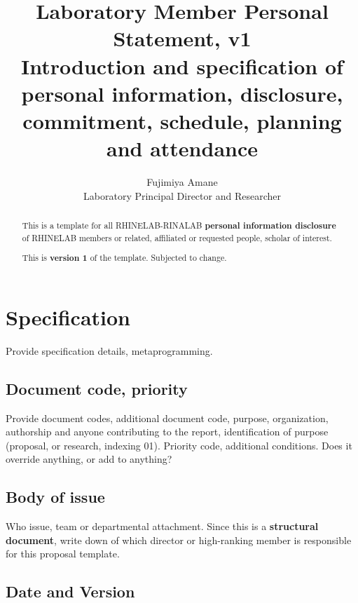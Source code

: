 \documentclass[10pt,a4paper]{article}
\title{\textbf{Laboratory Member Personal Statement}, v1  \\ {\small Introduction and specification of personal information, disclosure, commitment, schedule, planning and attendance}} %
\author{Fujimiya Amane \\ {\small Laboratory Principal Director and Researcher}} %
\affiliation{} %
\begin{document}
\maketitle

\begin{abstract}
    \noindent
    This is a template for all RHINELAB-RINALAB \textbf{personal information disclosure} of RHINELAB members or related, affiliated or requested people, scholar of interest. 
    
    This is \textbf{version 1} of the template. Subjected to change. 

\end{abstract}

\vspace{2.5cm}



\thispagestyle{firstpage}

\pagebreak


\newgeometry{} %

\section{Specification}
\label{sec:spec}

Provide specification details, metaprogramming. 

\subsection{Document code, priority}

Provide document codes, additional document code, purpose, organization, authorship and anyone contributing to the report, identification of purpose (proposal, or research, indexing 01). Priority code, additional conditions. Does it override anything, or add to anything?

\subsection{Body of issue}

Who issue, team or departmental attachment. Since this is a \textbf{structural document}, write down of which director or high-ranking member is responsible for this proposal template.  

\subsection{Date and Version}
\end{document}
